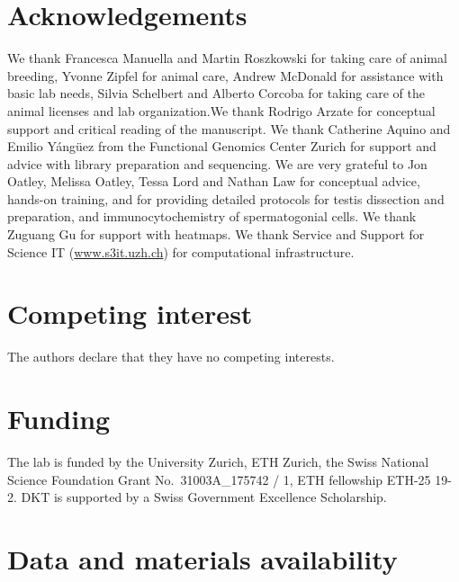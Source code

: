 \documentclass[12pt,twoside]{reedthesis}
\begin{document}
\hypertarget{acknowledgements}{%
\section{Acknowledgements}\label{acknowledgements}}

We thank Francesca Manuella and Martin Roszkowski for taking care of
animal breeding, Yvonne Zipfel for animal care, Andrew McDonald for
assistance with basic lab needs, Silvia Schelbert and Alberto Corcoba
for taking care of the animal licenses and lab organization.We thank
Rodrigo Arzate for conceptual support and critical reading of the
manuscript. We thank Catherine Aquino and Emilio Yángüez from the
Functional Genomics Center Zurich for support and advice with library
preparation and sequencing. We are very grateful to Jon Oatley, Melissa
Oatley, Tessa Lord and Nathan Law for conceptual advice, hands-on
training, and for providing detailed protocols for testis dissection and
preparation, and immunocytochemistry of spermatogonial cells. We thank
Zuguang Gu for support with heatmaps. We thank Service and Support for
Science IT (\href{http://www.s3it.uzh.ch/}{www.s3it.uzh.ch}) for
computational infrastructure.

\hypertarget{competing-interest}{%
\section{Competing interest}\label{competing-interest}}

The authors declare that they have no competing interests.

\hypertarget{funding}{%
\section{Funding}\label{funding}}

The lab is funded by the University Zurich, ETH Zurich, the Swiss
National Science Foundation Grant No.~31003A\_175742 / 1, ETH fellowship
ETH-25 19-2. DKT is supported by a Swiss Government Excellence
Scholarship.

\hypertarget{data-and-materials-availability}{%
\section{Data and materials availability}\label{data-and-materials-availability}}
\end{document}
